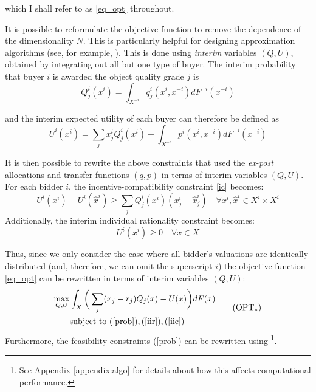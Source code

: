 \noindent which I shall refer to as \ref{eq_opt} throughout. 

It is possible to reformulate the objective function to remove the dependence of the dimensionality $N$. This is particularly helpful for designing approximation algorithms (see, for example, \cite{belloni2010multidimensional}). This is done using \textit{interim} variables $(Q, U)$, obtained by integrating out all but one type of buyer. The interim probability that buyer $i$ is awarded the object quality grade $j$ is
\begin{equation}
    Q_j^i(x^i) = \int_{X^{-i}} q_j^i(x^i,x^{-i}) dF^{-i}(x^{-i})
\end{equation}

\noindent and the interim expected utility of each buyer can therefore be defined as
\begin{equation}
    U^i(x^i) = \sum_j x_j^i Q_j^i(x^i) - \int_{X^{-i}} p^i(x^i,x^{-i}) dF^{-i}(x^{-i})
\end{equation}

It is then possible to rewrite the above constraints that used the \textit{ex-post} allocations and transfer functions $(q,p)$ in terms of interim variables $(Q,U)$. For each bidder $i$, the incentive-compatibility constraint \ref{ic} becomes:
\begin{equation}\label{iic}
    U^i(x^i) - U^i(\hat{x}^i) \geq \sum_j Q_j^i(x^i) (x_j^i - \hat{x}_j^i) \quad \forall x^i, \hat{x}^i \in X^i \times X^i \tag{IIC}
\end{equation}
\noindent Additionally, the interim individual rationality constraint becomes:
\begin{equation}\label{iir}
    U^i(x^i) \geq 0 \quad \forall x \in X \tag{IIR}
\end{equation}

Thus, since we only consider the case where all bidder's valuations are identically distributed (and, therefore, we can omit the superscript $i$) the objective function \ref{eq_opt} can be rewritten in terms of interim variables $(Q,U)$:
\begin{equation}
\begin{aligned}\label{eq_opt_interim}
    \max_{Q,U} &\int_X \bigg( \sum_j (x_j - r_j) Q_j(x) - U(x) \bigg) dF(x) \\
    &\text{subject to } (\ref{prob}), (\ref{iir}), (\ref{iic})
\end{aligned}  \tag{OPT$_*$} 
\end{equation}
\noindent Furthermore, the feasibility constraints (\ref{prob}) can be rewritten using \autocite{border1991implementation}\footnote{See Appendix \ref{appendix:algo} for details about how this affects computational performance.}.





